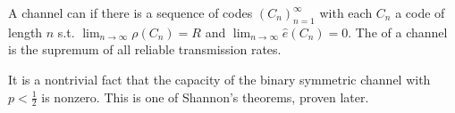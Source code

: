 \begin{definition}[Capacity]
    A channel can  if there is a sequence of codes $(C_n)_{n=1}^\infty$ with each $C_n$ a code of length $n$ s.t. $\lim_{n \to \infty} \rho(C_n) = R$ and $\lim_{n \to \infty} \hat e(C_n) = 0$.
    The  of a channel is the supremum of all reliable transmission rates.
\end{definition}

It is a nontrivial fact that the capacity of the binary symmetric channel with $p < \frac{1}{2}$ is nonzero.
This is one of Shannon's theorems, proven later.
